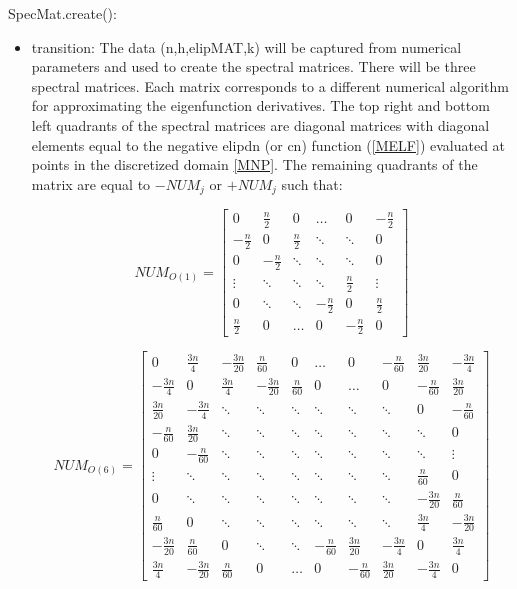 \documentclass[12pt, titlepage]{article}
\begin{document}
\noindent
SpecMat.create():
\begin{itemize}
	\item transition: The data (n,h,elipMAT,k) will be captured from numerical 
	parameters and used to create the spectral matrices. There will be three 
	spectral matrices. Each matrix corresponds to a different 
	numerical 
	algorithm for approximating the eigenfunction derivatives. The top right 
	and 
	bottom left quadrants of the spectral matrices are diagonal matrices with 
	diagonal  
	elements 
	equal to the negative elipdn (or cn) function (\ref{MELF}) evaluated at 
	points in 
	the 
	discretized domain \ref{MNP}. 
	The remaining quadrants of the matrix are equal to $-NUM_{j}$ or $+NUM_{j}$ 
	such that: 
	
\[
NUM_{O(1)}=
\begin{bmatrix}
0 & \frac{n}{2} & 0 & \dots & 0 &-\frac{n}{2}\\
-\frac{n}{2} & 0 & \frac{n}{2} & \ddots & \ddots &0\\
0 & -\frac{n}{2} & \ddots & \ddots & \ddots &0\\
\vdots & \ddots & \ddots & \ddots & \frac{n}{2} &\vdots \\
0 & \ddots & \ddots & -\frac{n}{2} & 0 &\frac{n}{2} \\ 
\frac{n}{2} & 0 & \dots & 0 & -\frac{n}{2} & 0 
\end{bmatrix}
\] 

\[
NUM_{O(6)}=
\begin{bmatrix}
0 & \frac{3n}{4} & -\frac{3n}{20} & \frac{n}{60} &0& \dots&0 & -\frac{n}{60} & 
\frac{3n}{20} & 
-\frac{3n}{4}\\
-\frac{3n}{4} & 0 & \frac{3n}{4} & -\frac{3n}{20} & \frac{n}{60}&0 &\dots&0& 
-\frac{n}{60} & 
\frac{3n}{20}\\
\frac{3n}{20} & -\frac{3n}{4} & \ddots & \ddots & \ddots &\ddots & 
\ddots&\ddots&0 
&-\frac{n}{60}\\
-\frac{n}{60} & \frac{3n}{20} & \ddots & \ddots & \ddots &\ddots & \ddots 
&\ddots &\ddots&0\\ 
0 & -\frac{n}{60} & \ddots & \ddots & \ddots& \ddots& \ddots& \ddots 
&\ddots&\vdots\\
\vdots & \ddots & \ddots & \ddots & \ddots & \ddots& 
\ddots&\ddots&\frac{n}{60}&0\\
0 & \ddots & \ddots & \ddots & \ddots &\ddots & \ddots& \ddots& -\frac{3n}{20} 
& 
\frac{n}{60}\\ 
\frac{n}{60} & 0 & \ddots & \ddots & \ddots & \ddots & \ddots& 
\ddots&\frac{3n}{4}  
&-\frac{3n}{20} 
\\ 
-\frac{3n}{20} & \frac{n}{60} & 0 &\ddots & \ddots & 
 -\frac{n}{60} & \frac{3n}{20} &-\frac{3n}{4} &0 
&\frac{3n}{4}  \\ 
\frac{3n}{4} & -\frac{3n}{20} & \frac{n}{60} & 0 & \dots & 
0 & 
-\frac{n}{60} &\frac{3n}{20} & -\frac{3n}{4} & 0 
\end{bmatrix}
\]  


\end{itemize}
\end{document}
